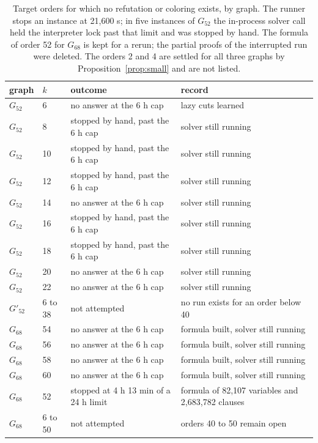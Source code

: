 \documentclass[11pt]{article}
\theoremstyle{definition}
\theoremstyle{remark}
\newcommand{\Ga}{G_{52}}
\newcommand{\Gb}{G'_{52}}
\newcommand{\Gsix}{G_{68}}
\begin{document}
\begin{table}[tbp]\centering\small
\begin{tabular}{ll>{\raggedright\arraybackslash}p{5.2cm}>{\raggedright\arraybackslash}p{5.6cm}}
\toprule
graph & $k$ & outcome & record\\
\midrule
$\Ga$ & 6 & no answer at the 6 h cap & 25 lazy cuts learned \\
$\Ga$ & 8 & stopped by hand, past the 6 h cap & solver still running \\
$\Ga$ & 10 & stopped by hand, past the 6 h cap & solver still running \\
$\Ga$ & 12 & stopped by hand, past the 6 h cap & solver still running \\
$\Ga$ & 14 & no answer at the 6 h cap & solver still running \\
$\Ga$ & 16 & stopped by hand, past the 6 h cap & solver still running \\
$\Ga$ & 18 & stopped by hand, past the 6 h cap & solver still running \\
$\Ga$ & 20 & no answer at the 6 h cap & solver still running \\
$\Ga$ & 22 & no answer at the 6 h cap & solver still running \\
\midrule
$\Gb$ & 6 to 38 & not attempted & no run exists for an order below 40 \\
\midrule
$\Gsix$ & 54 & no answer at the 6 h cap & formula built, solver still running \\
$\Gsix$ & 56 & no answer at the 6 h cap & formula built, solver still running \\
$\Gsix$ & 58 & no answer at the 6 h cap & formula built, solver still running \\
$\Gsix$ & 60 & no answer at the 6 h cap & formula built, solver still running \\
$\Gsix$ & 52 & stopped at 4 h 13 min of a 24 h limit & formula of 82{,}107 variables and 2{,}683{,}782 clauses \\
$\Gsix$ & 6 to 50 & not attempted & orders 40 to 50 remain open \\
\bottomrule
\end{tabular}
\caption{Target orders for which no refutation or coloring exists, by graph. The runner stops an instance at 21,600 s; in five instances of \(\Ga\) the in-process solver call held the interpreter lock past that limit and was stopped by hand. The formula of order 52 for \(\Gsix\) is kept for a rerun; the partial proofs of the interrupted run were deleted. The orders 2 and 4 are settled for all three graphs by Proposition~\ref{prop:small} and are not listed.}\label{tab:undecided}
\end{table}
\end{document}
